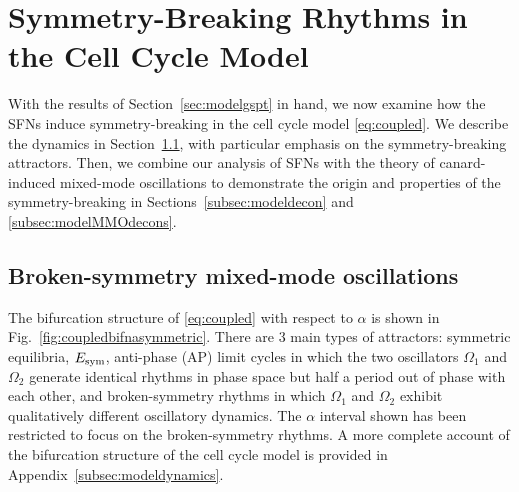 \documentclass[10pt,onecolumn]{article}
\theoremstyle{plain}
\begin{document}
\section{Symmetry-Breaking Rhythms in the Cell Cycle Model} \label{sec:cellmodelsymmbreaking}
With the results of Section~\ref{sec:modelgspt} in hand, we now examine how the SFNs induce symmetry-breaking in the cell cycle model \eqref{eq:coupled}. We describe the dynamics in Section~\ref{subsec:modelmmos}, with particular emphasis on the symmetry-breaking attractors. Then, we combine our analysis of SFNs with the theory of canard-induced mixed-mode oscillations \cite{Brons2006} to demonstrate the origin and properties of the symmetry-breaking in Sections~\ref{subsec:modeldecon} and \ref{subsec:modelMMOdecons}. 


\subsection{Broken-symmetry mixed-mode oscillations} \label{subsec:modelmmos}
The bifurcation structure of \eqref{eq:coupled} with respect to $\alpha$ is shown in Fig.~\ref{fig:coupledbifnasymmetric}. There are 3 main types of attractors: symmetric equilibria, $E_{\rm sym}$, anti-phase (AP) limit cycles in which the two oscillators $\Omega_1$ and $\Omega_2$ generate identical rhythms in phase space but half a period out of phase with each other, and broken-symmetry rhythms in which $\Omega_1$ and $\Omega_2$ exhibit qualitatively different oscillatory dynamics. 
The $\alpha$ interval shown has been restricted to focus on the broken-symmetry rhythms. A more complete account of the bifurcation structure of the cell cycle model is provided in Appendix~\ref{subsec:modeldynamics}.
\end{document}
